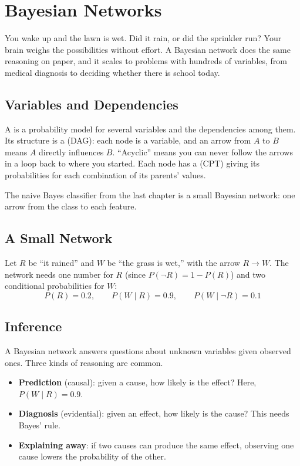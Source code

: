 \chapter{Bayesian Networks}

You wake up and the lawn is wet. Did it rain, or did the sprinkler run? Your brain weighs the possibilities
without effort. A Bayesian network does the same reasoning on paper, and it scales to problems with hundreds of
variables, from medical diagnosis to deciding whether there is school today.

\section{Variables and Dependencies}
A  is a probability model for several variables and the dependencies among them. Its
structure is a  (DAG): each node is a variable, and
an arrow from $A$ to $B$ means $A$ directly influences $B$. ``Acyclic'' means you can never follow the arrows in a
loop back to where you started. Each node has a  (CPT) giving its probabilities for each combination of its parents' values.

The naive Bayes classifier from the last chapter is a small Bayesian network: one arrow from the class to each
feature.

\section{A Small Network}
Let $R$ be ``it rained'' and $W$ be ``the grass is wet,'' with the arrow $R \to W$. The network needs one number
for $R$ (since $P(\neg R) = 1 - P(R)$) and two conditional probabilities for $W$:
$$P(R) = 0.2, \qquad P(W \mid R) = 0.9, \qquad P(W \mid \neg R) = 0.1$$

\section{Inference}
A Bayesian network answers questions about unknown variables given observed ones. Three kinds of reasoning are
common.
\begin{itemize}
\item \textbf{Prediction} (causal): given a cause, how likely is the effect? Here, $P(W \mid R) = 0.9$.
\item \textbf{Diagnosis} (evidential): given an effect, how likely is the cause? This needs Bayes' rule.
\item \textbf{Explaining away}: if two causes can produce the same effect, observing one cause lowers the
probability of the other.
\end{itemize}

